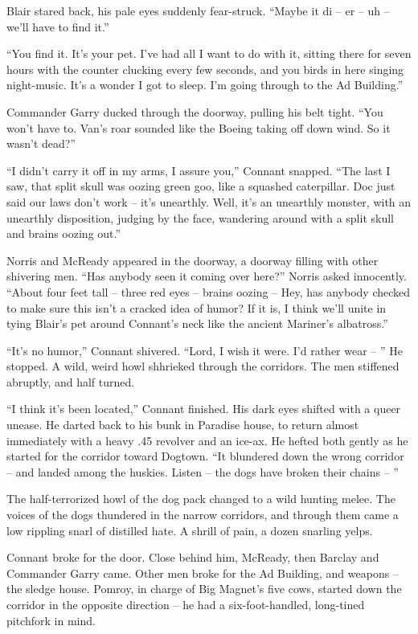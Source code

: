 \documentclass[ebook,oneside,11pt]{memoir}				%
\begin{document}
Blair stared back, his pale eyes suddenly fear-struck. ``Maybe it di -- er -- uh -- we'll have to find it.''

``You find it. It's your pet. I've had all I want to do with it, sitting there for seven hours with the counter clucking every few seconds, and you birds in here singing night-music. It's a wonder I got to sleep. I'm going through to the Ad Building.''

Commander Garry ducked through the doorway, pulling his belt tight. ``You won't have to. Van's roar sounded like the Boeing taking off down wind. So it wasn't dead?''

``I didn't carry it off in my arms, I assure you,'' Connant snapped. ``The last I saw, that split skull was oozing green goo, like a squashed caterpillar. Doc just said our laws don't work -- it's unearthly. Well, it's an unearthly monster, with an unearthly disposition, judging by the face, wandering around with a split skull and brains oozing out.''

Norris and McReady appeared in the doorway, a doorway filling with other shivering men. ``Has anybody seen it coming over here?'' Norris asked innocently. ``About four feet tall -- three red eyes -- brains oozing -- Hey, has anybody checked to make sure this isn't a cracked idea of humor? If it is, I think we'll unite in tying Blair's pet around Connant's neck like the ancient Mariner's albatross.''

``It's no humor,'' Connant shivered. ``Lord, I wish it were. I'd rather wear -- '' He stopped. A wild, weird howl shhrieked through the corridors. The men stiffened abruptly, and half turned.

``I think it's been located,'' Connant finished. His dark eyes shifted with a queer unease. He darted back to his bunk in Paradise house, to return almost immediately with a heavy .45 revolver and an ice-ax. He hefted both gently as he started for the corridor toward Dogtown. ``It blundered down the wrong corridor -- and landed among the huskies. Listen -- the dogs have broken their chains -- ''

The half-terrorized howl of the dog pack changed to a wild hunting melee. The voices of the dogs thundered in the narrow corridors, and through them came a low rippling snarl of distilled hate. A shrill of pain, a dozen snarling yelps.

Connant broke for the door. Close behind him, McReady, then Barclay and Commander Garry came. Other men broke for the Ad Building, and weapons -- the sledge house. Pomroy, in charge of Big Magnet's five cows, started down the corridor in the opposite direction -- he had a six-foot-handled, long-tined pitchfork in mind.
\end{document}
